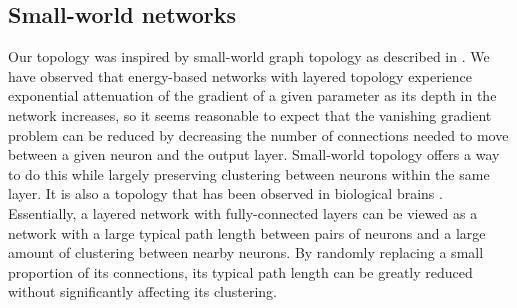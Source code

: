 \documentclass{article}
\begin{document}
\subsection{Small-world networks}
\label{sec:sw_background}

Our topology was inspired by small-world graph topology as described in \cite{watts98}. We have observed that energy-based networks with layered topology experience exponential attenuation of the gradient of a given parameter as its depth in the network increases, so it seems reasonable to expect that the vanishing gradient problem can be reduced by decreasing the number of connections needed to move between a given neuron and the output layer. Small-world topology offers a way to do this while largely preserving clustering between neurons within the same layer. It is also a topology that has been observed in biological brains \cite{bullmore2009}. Essentially, a layered network with fully-connected layers can be viewed as a network with a large typical path length between pairs of neurons and a large amount of clustering between nearby neurons. By randomly replacing a small proportion of its connections, its typical path length can be greatly reduced without significantly affecting its clustering.
\end{document}
